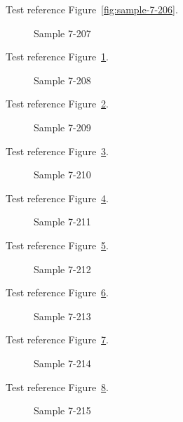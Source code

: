 Test reference Figure~\ref{fig:sample-7-206}.

\begin{figure}[tbhp]
\caption{Sample 7-207}
\label{fig:sample-7-207}
\end{figure}

Test reference Figure~\ref{fig:sample-7-207}.

\begin{figure}[tbhp]
\caption{Sample 7-208}
\label{fig:sample-7-208}
\end{figure}

Test reference Figure~\ref{fig:sample-7-208}.

\begin{figure}[tbhp]
\caption{Sample 7-209}
\label{fig:sample-7-209}
\end{figure}

Test reference Figure~\ref{fig:sample-7-209}.

\begin{figure}[tbhp]
\caption{Sample 7-210}
\label{fig:sample-7-210}
\end{figure}

Test reference Figure~\ref{fig:sample-7-210}.

\begin{figure}[tbhp]
\caption{Sample 7-211}
\label{fig:sample-7-211}
\end{figure}

Test reference Figure~\ref{fig:sample-7-211}.

\begin{figure}[tbhp]
\caption{Sample 7-212}
\label{fig:sample-7-212}
\end{figure}

Test reference Figure~\ref{fig:sample-7-212}.

\begin{figure}[tbhp]
\caption{Sample 7-213}
\label{fig:sample-7-213}
\end{figure}

Test reference Figure~\ref{fig:sample-7-213}.

\begin{figure}[tbhp]
\caption{Sample 7-214}
\label{fig:sample-7-214}
\end{figure}

Test reference Figure~\ref{fig:sample-7-214}.

\begin{figure}[tbhp]
\caption{Sample 7-215}
\label{fig:sample-7-215}
\end{figure}

